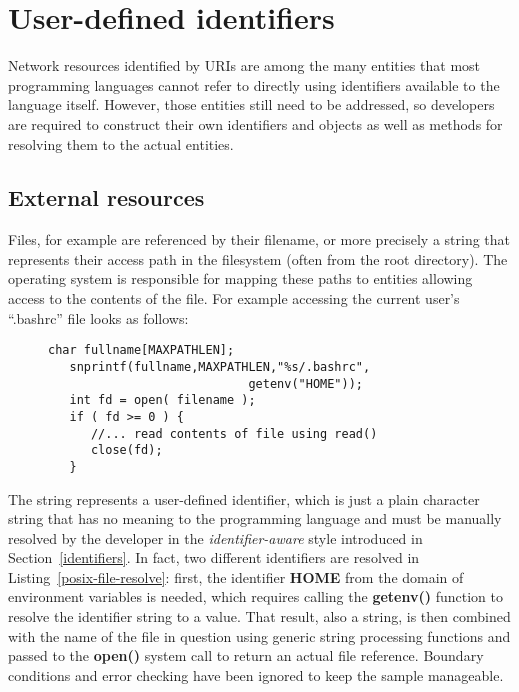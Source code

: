 \documentclass[preprint,authoryear]{acm_proc_article-sp}
\begin{document}
\section{User-defined identifiers}
\label{user-defined-identifiers}

Network resources identified by URIs are among the many entities that most
programming languages cannot refer to directly using identifiers available to the
language itself.
However, those entities still need to be addressed, so developers are required
to construct their own identifiers  and objects as well as methods for resolving them to the actual
entities.

\subsection{External resources}

Files, for example are referenced by their filename, or more precisely
a string that represents their access path in the filesystem (often from the root 
directory).  The operating system is responsible for mapping these
paths to entities allowing access to the contents of the file.  For example accessing
the current user's ``.bashrc'' file looks as follows:


\begin{figure}[htbp]
\begin{lstlisting}[style=L,label=posix-file-resolve,caption=Resolving a name to a file in the user's home directory.]
   char fullname[MAXPATHLEN];
   snprintf(fullname,MAXPATHLEN,"%s/.bashrc",
                            getenv("HOME"));
   int fd = open( filename );
   if ( fd >= 0 ) { 
      //... read contents of file using read()
      close(fd);
   }
\end{lstlisting}
\end{figure}

The string represents a user-defined identifier, which is just a plain character
string that has no meaning to the programming language and must be 
manually resolved by the developer in the {\em identifier-aware} style 
introduced in Section~\ref{identifiers}.  In fact, two different identifiers
are resolved in Listing~\ref{posix-file-resolve}:  first, the identifier {\bf HOME}
from the domain of environment variables is needed, which requires calling
the {\bf getenv()} function to resolve the identifier string to a value.  That result,
also a string, is then combined with the name of the file in question using generic
string processing functions and passed
to the {\bf open()} system call to return an actual file reference.  Boundary conditions
and error checking have been ignored to keep the sample manageable.
\end{document}
